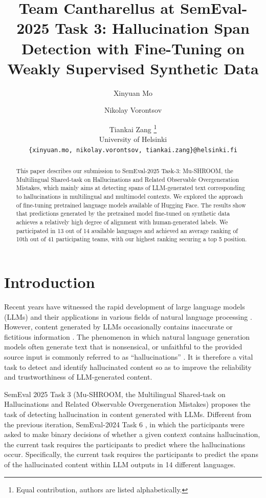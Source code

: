 \documentclass[11pt]{article}
\title{Team Cantharellus at SemEval-2025 Task 3: Hallucination Span Detection with Fine-Tuning on Weakly Supervised Synthetic Data}
\author{Xinyuan Mo \and Nikolay Vorontsov \and Tiankai Zang \thanks{\hspace{0.6em}Equal contribution, authors are listed alphabetically.} \\
  University of Helsinki \\
  \texttt{\{xinyuan.mo, nikolay.vorontsov, tiankai.zang\}@helsinki.fi} \\}
\begin{document}
\maketitle
\begin{abstract}
This paper describes our submission to SemEval-2025 Task-3: Mu-SHROOM, the Multilingual Shared-task on Hallucinations and Related Observable Overgeneration Mistakes, which mainly aims at detecting spans of LLM-generated text corresponding to hallucinations in multilingual and multimodel contexts. We explored the approach of fine-tuning pretrained language models available of Hugging Face. The results show that predictions generated by the pretrained model fine-tuned on synthetic data achieves a relatively high degree of alignment with human-generated labels. We participated in 13 out of 14 available languages and achieved an average ranking of 10th out of 41 participating teams, with our highest ranking securing a top 5 position.


\end{abstract}


\section{Introduction}
Recent years have witnessed the rapid development of large language models (LLMs) and their applications in various fields of natural language processing \cite{wei2022chain, zhao2023survey}. However, content generated by LLMs occasionally contains inaccurate or fictitious information \cite{perkovic2024hallucinations}. The phenomenon in which natural language generation models often generate text that is nonsensical, or unfaithful to the provided source input is commonly referred to as “hallucinations” \cite{ji2023survey}. It is therefore a vital task to detect and identify hallucinated content so as to improve the reliability and trustworthiness of LLM-generated content.

SemEval 2025 Task 3 (Mu-SHROOM, the Multilingual Shared-task on Hallucinations and Related Observable Overgeneration Mistakes) \cite {vazquez-etal-2025-mu-shroom} proposes the task of detecting hallucination in content generated with LLMs. Different from the previous iteration, SemEval-2024 Task 6 \cite{mickus2024semeval}, in which the participants were asked to make binary decisions of whether a given context contains hallucination, the current task requires the participants to predict where the hallucinations occur. Specifically, the current task requires the participants to predict the spans of the hallucinated content within LLM outputs in 14 different languages.  
\end{document}
